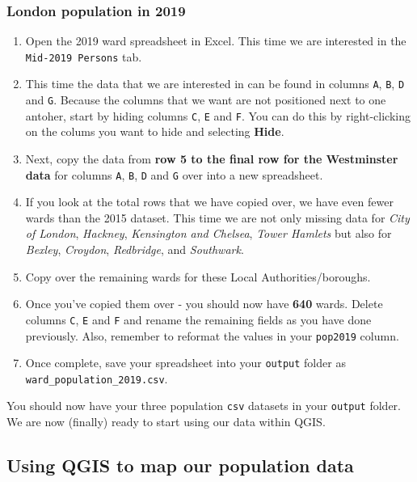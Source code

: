 \documentclass[
]{book}
\providecommand{\tightlist}{%
  \setlength{\itemsep}{0pt}\setlength{\parskip}{0pt}}
\begin{document}
\hypertarget{london-population-in-2019}{%
\subsubsection{London population in 2019}\label{london-population-in-2019}}

\begin{enumerate}
\def\labelenumi{\arabic{enumi}.}
\tightlist
\item
  Open the 2019 ward spreadsheet in Excel. This time we are interested in the \texttt{Mid-2019\ Persons} tab.
\item
  This time the data that we are interested in can be found in columns \texttt{A}, \texttt{B}, \texttt{D} and \texttt{G}. Because the columns that we want are not positioned next to one antoher, start by hiding columns \texttt{C}, \texttt{E} and \texttt{F}. You can do this by right-clicking on the colums you want to hide and selecting \textbf{Hide}.
\item
  Next, copy the data from \textbf{row 5 to the final row for the Westminster data} for columns \texttt{A}, \texttt{B}, \texttt{D} and \texttt{G} over into a new spreadsheet.
\item
  If you look at the total rows that we have copied over, we have even fewer wards than the 2015 dataset. This time we are not only missing data for \emph{City of London}, \emph{Hackney}, \emph{Kensington and Chelsea}, \emph{Tower Hamlets} but also for \emph{Bexley}, \emph{Croydon}, \emph{Redbridge}, and \emph{Southwark}.
\item
  Copy over the remaining wards for these Local Authorities/boroughs.
\item
  Once you've copied them over - you should now have \textbf{640} wards. Delete columns \texttt{C}, \texttt{E} and \texttt{F} and rename the remaining fields as you have done previously. Also, remember to reformat the values in your \texttt{pop2019} column.
\item
  Once complete, save your spreadsheet into your \texttt{output} folder as \texttt{ward\_population\_2019.csv}.
\end{enumerate}

You should now have your three population \texttt{csv} datasets in your \texttt{output} folder. We are now (finally) ready to start using our data within QGIS.

\hypertarget{using-qgis-to-map-our-population-data}{%
\subsection{Using QGIS to map our population data}\label{using-qgis-to-map-our-population-data}}
\end{document}
